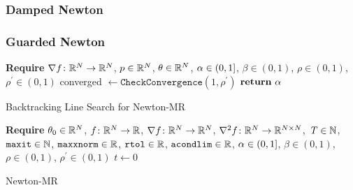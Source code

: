 \documentclass[../../thesis.tex]{subfiles}
\begin{document}
\subsubsection{Damped Newton}

\subsubsection{Guarded Newton}

\begin{algorithm}[H]
    \SetAlgoLined{}
    \textbf{Require}
    $\nabla f\colon\mathbb{R}^N\to\mathbb{R}^N$,
    $p \in \mathbb{R}^N$,
    $\theta \in \mathbb{R}^N$,
    $\alpha \in \intervaloc{0}{1}$,
    $\beta \in (0, 1)$,
    $\rho \in (0, 1)$,
    $\rho^\prime \in (0, 1)$
    \DontPrintSemicolon
    \;
    converged $\leftarrow \texttt{CheckConvergence}\left(
    	1, \rho^\prime\right)$\;
    $\KwRet\ \alpha$
    \caption{Backtracking Line Search for Newton-MR}
\end{algorithm}

\begin{algorithm}[H]
    \SetAlgoLined{}
    \textbf{Require}
    $\theta_0 \in \mathbb{R}^N$,
    $f\colon\mathbb{R}^N\to\mathbb{R}$,
    $\nabla{f}\colon\mathbb{R}^N\to\mathbb{R}^N$,
    $\nabla^2{f}\colon\mathbb{R}^N\to\mathbb{R}^{N\times N}$,\
    $T\in \mathbb{N}$,\\
    $\texttt{maxit} \in \mathbb{N}$,
    $\texttt{maxxnorm} \in \mathbb{R}$,
    $\texttt{rtol} \in \mathbb{R}$,
    $\texttt{acondlim} \in \mathbb{R}$,
    $\alpha \in \intervaloc{0}{1}$,
    $\beta \in (0, 1)$,
    $\rho \in (0, 1)$,
    $\rho^\prime \in (0, 1)$
    $t \leftarrow 0$\\
    \caption{Newton-MR}
\end{algorithm}
\end{document}
